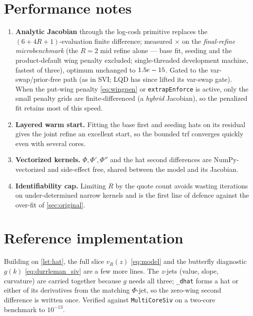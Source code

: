 \documentclass[11pt]{article}
\begin{document}
\section{Performance notes}
\label{app:perf}

\begin{enumerate}[leftmargin=1.6em]
\item \textbf{Analytic Jacobian} through the log-cosh primitive replaces the
$(6+4R+1)$-evaluation finite difference; measured \sivspeedup$\times$ on the
\emph{final-refine microbenchmark} (the $R=2$ mid refine alone --- base fit,
seeding and the product-default wing penalty excluded; single-threaded
development machine, fastest of three), optimum unchanged to $1.5e-15$.
Gated to the var-swap/prior-free path (as in SVI; LQD has since lifted its
var-swap gate). When the put-wing penalty
\eqref{eq:wingpen} or \texttt{extrapEnforce} is active, only the small penalty
grids are finite-differenced (a \emph{hybrid} Jacobian), so the penalized fit
retains most of this speed.
\item \textbf{Layered warm start.} Fitting the base first and seeding hats on its
residual gives the joint refine an excellent start, so the bounded trf converges
quickly even with several cores.
\item \textbf{Vectorized kernels.} $\Phi,\Phi',\Phi''$ and the hat second
differences are NumPy-vectorized and side-effect free, shared between the model
and its Jacobian.
\item \textbf{Identifiability cap.} Limiting $R$ by the quote count avoids wasting
iterations on under-determined narrow kernels and is the first line of defence
against the over-fit of \cref{sec:original}.
\end{enumerate}

\section{Reference implementation}
\label{app:ref}

Building on \cref{lst:hat}, the full slice $v_R(z)$ \eqref{eq:model} and the
butterfly diagnostic $g(k)$ \eqref{eq:durrleman_siv} are a few more lines. The
$z$-jets (value, slope, curvature) are carried together because $g$ needs all
three; \texttt{\_dhat} forms a hat or either of its derivatives from the matching
$\Phi$-jet, so the zero-wing second difference is written once. Verified against
\texttt{MultiCoreSiv} on a two-core benchmark to $10^{-13}$.
\end{document}
